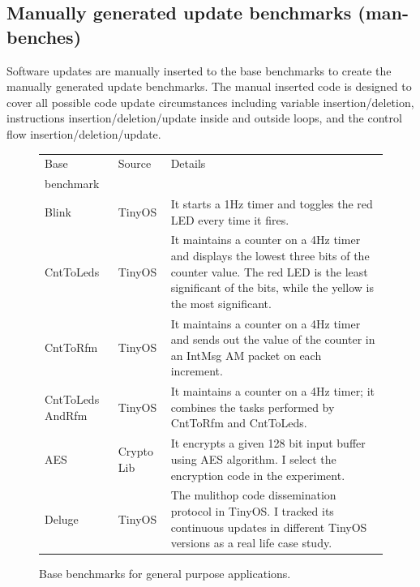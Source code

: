 \subsection{Manually generated update benchmarks (man-benches)}
Software updates are manually inserted to the base benchmarks to create the
manually generated update benchmarks.
The manual inserted code is designed to cover all possible code update circumstances
including variable insertion/deletion, 
instructions insertion/deletion/update inside and outside loops, and the control flow
insertion/deletion/update.
\begin{figure}[htbp]
\centering
\begin{small}
\begin{tabular}{||p{1in}|p{0.5in}|p{4in}||} 
\hline
Base  & Source & Details \\ 
benchmark & & \\\hline  \hline

Blink & TinyOS & It starts a 1Hz timer and toggles the red
LED every time it fires. \\ \hline

CntToLeds & TinyOS & It maintains a counter on a 4Hz timer and
displays the lowest three bits of the counter value. The red LED is
the least significant of the bits, while the yellow is the most
significant. \\ \hline

CntToRfm & TinyOS & It maintains a counter on a 4Hz timer and sends
out the value of the counter in an IntMsg AM packet on each
increment. \\ \hline

CntToLeds AndRfm & TinyOS & It maintains a counter on a 4Hz timer; it
combines the tasks performed by CntToRfm and CntToLeds. \\ \hline

AES & Crypto Lib & It encrypts a given 128 bit input buffer using AES
algorithm. I select the encryption code in the experiment.\\ \hline \hline

Deluge & TinyOS & The mulithop code dissemination protocol in TinyOS. I tracked its continuous updates in different 
TinyOS versions as a real life case study. \\ \hline
\end{tabular}
\end{small}
\caption{Base benchmarks for general purpose applications.}
\label{fbench}
\end{figure}


